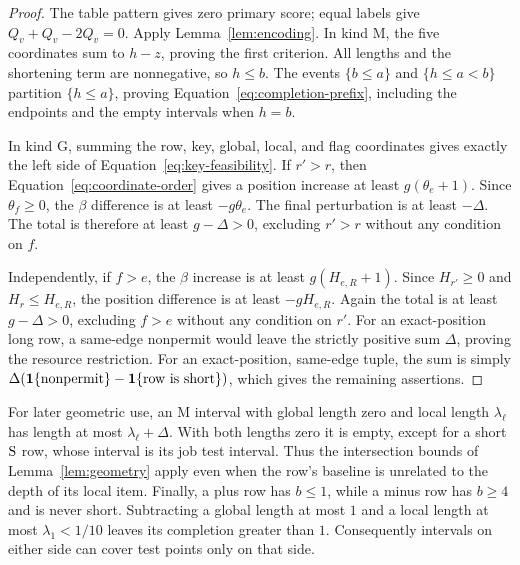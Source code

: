\begin{proof}
The table pattern gives zero primary score; equal labels give
$Q_v+Q_v-2Q_v=0$. Apply Lemma~\ref{lem:encoding}. In kind
$\mathrm M$, the five coordinates sum to $h-z$, proving the first
criterion. All lengths and the shortening term are nonnegative, so
$h\le b$. The events $\{b\le a\}$ and $\{h\le a<b\}$ partition
$\{h\le a\}$, proving Equation~\eqref{eq:completion-prefix}, including
the endpoints and the empty intervals when $h=b$.

In kind $\mathrm G$, summing the row, key, global, local, and flag
coordinates gives exactly the left side of
Equation~\eqref{eq:key-feasibility}. If $r'>r$, then
Equation~\eqref{eq:coordinate-order} gives a position increase at least
$g(\theta_e+1)$. Since $\theta_f\ge0$, the $\beta$ difference is at
least $-g\theta_e$. The final perturbation is at least $-\Delta$.
The total is therefore at least $g-\Delta>0$, excluding $r'>r$
without any condition on $f$.

Independently, if $f>e$, the $\beta$ increase is at least
$g(H_{e,R}+1)$. Since $H_{r'}\ge0$ and $H_r\le H_{e,R}$, the
position difference is at least $-gH_{e,R}$. Again the total is at
least $g-\Delta>0$, excluding $f>e$ without any condition on $r'$.
For an exact-position long row, a same-edge nonpermit would leave
the strictly positive sum $\Delta$, proving the resource restriction.
For an exact-position, same-edge tuple, the sum is simply
$\Delta(\mathbf{1}\{\text{nonpermit}\}-
\mathbf{1}\{\text{row is short}\})$, which gives the remaining assertions.
\end{proof}

For later geometric use, an $\mathrm M$ interval with global length
zero and local length $\lambda_\ell$ has length at most
$\lambda_\ell+\Delta$. With both lengths zero it is empty, except
for a short $\mathrm{S}$ row, whose interval is its job test interval.
Thus the intersection bounds of Lemma~\ref{lem:geometry} apply even
when the row's baseline is unrelated to the depth of its local item.
Finally, a plus row has $b\le1$, while a minus row has $b\ge4$ and
is never short. Subtracting a global length at most $1$ and a local
length at most $\lambda_1<1/10$ leaves its completion greater than
$1$. Consequently intervals on either side can cover test points
only on that side.
